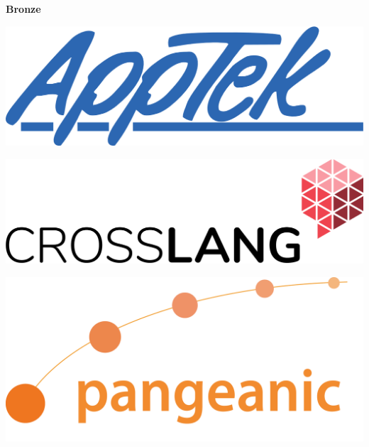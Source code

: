 \documentclass[11pt,oneside]{book}
\begin{document}
  \bigskip
  \bigskip
    \begin{samepage}
  \noindent
  {\Large \textbf{Bronze}}

  \nopagebreak
  \begin{minipage}[c][0.21\linewidth][c]{0.30\linewidth}
     \includegraphics[width=\linewidth]{eamt_volume_1/sponsor_logos/media.png}
  \end{minipage}\hspace{0.05\linewidth}
  \begin{minipage}[c][0.21\linewidth][c]{0.30\linewidth}
     \includegraphics[width=\linewidth]{eamt_volume_1/sponsor_logos/CrossLang-logo-RGB-HR.png}
  \end{minipage}\hspace{0.05\linewidth}
   \begin{minipage}[c][0.21\linewidth][c]{0.30\linewidth}
     \includegraphics[width=\linewidth]{eamt_volume_1/sponsor_logos/Logo_Pangeanic_Alta.png}
   \end{minipage}\hspace{0.05\linewidth}
    \begin{minipage}[c][0.21\linewidth][c]{0.30\linewidth}

\end{minipage}
\end{samepage}
\end{document}
